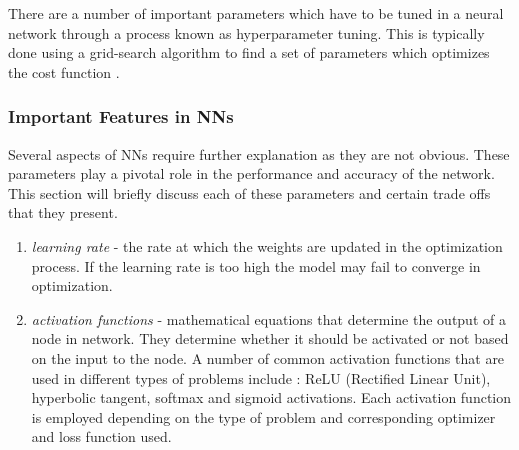 There are a number of important parameters which have to be tuned in a neural
network through a process known as hyperparameter tuning. This is typically done
using a grid-search algorithm to find a set of parameters which optimizes the
cost function \cite{LiDL2019}.

\subsubsection{Important Features in \ac{NN}s}
Several aspects of \ac{NN}s require further explanation as they are not obvious.
These parameters play a pivotal role in the performance and accuracy of the
network. This section will briefly discuss each of these parameters and certain
trade offs that they present.

\begin{enumerate}
  \item \emph{learning rate} - the rate at which the weights are updated in the
        optimization process. If the learning rate is too high the model may
        fail to converge in optimization.
  \item \emph{activation functions} - mathematical equations that determine the
        output of a node in network. They determine whether it should be
        activated or not based on the input to the node. A number of common
        activation functions that are used in different types of problems
        include : ReLU (Rectified Linear Unit), hyperbolic tangent, softmax
        and sigmoid activations. Each activation function is employed depending
        on the type of problem and corresponding optimizer and loss function
        used.


\end{enumerate}
